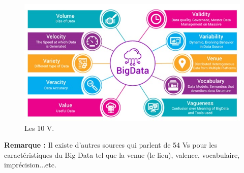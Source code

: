 \begin{figure}[h]
	\centering
	\includegraphics[scale=0.5]{img/part1/1.6}
	\caption{Les 10 V.}
\end{figure}

\textbf{Remarque :} Il existe d'autres sources qui parlent de 54 Vs pour les caractéristiques du Big Data tel que la venue (le lieu), valence, vocabulaire, imprécision...etc.







